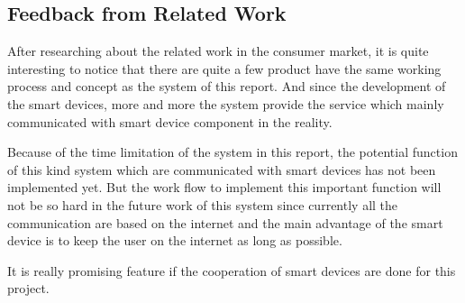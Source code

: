 \subsection{Feedback from Related Work}
\par After researching about the related work in the consumer market, it is quite interesting to notice that there are quite a few product have the same working process and concept as the system of this report. And since the development of the smart devices, more and more the system provide the service which mainly communicated with smart device component in the reality.
\par Because of the time limitation of the system in this report, the potential function of this kind system which are communicated with smart devices has not been implemented yet. But the work flow to implement this important function will not be so hard in the future work of this system since currently all the communication are based on the internet and the main advantage of the smart device is to keep the user on the internet as long as possible.
\par It is really promising feature if the cooperation of smart devices are done for this project. 
